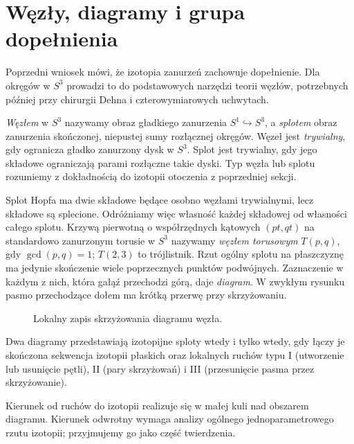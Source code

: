 \section{Węzły, diagramy i grupa dopełnienia}
\label{sec:wezly-diagramy-wirtinger}

Poprzedni wniosek mówi, że izotopia zanurzeń zachowuje
dopełnienie. Dla okręgów w $S^3$ prowadzi to do
podstawowych narzędzi teorii węzłów, potrzebnych później
przy chirurgii Dehna i czterowymiarowych uchwytach.

\begin{definicja}
\emph{Węzłem} w $S^3$ nazywamy obraz gładkiego
zanurzenia $S^1\hookrightarrow S^3$, a \emph{splotem}
obraz zanurzenia skończonej, niepustej sumy rozłącznej
okręgów. Węzeł jest \emph{trywialny}, gdy ogranicza
gładko zanurzony dysk w $S^3$. Splot jest trywialny,
gdy jego składowe ograniczają parami rozłączne takie
dyski. Typ węzła lub splotu rozumiemy z dokładnością
do izotopii otoczenia z poprzedniej sekcji.
\end{definicja}

Splot Hopfa ma dwie składowe będące osobno węzłami
trywialnymi, lecz składowe są splecione. Odróżniamy
więc własność każdej składowej od własności całego
splotu. Krzywą pierwotną o współrzędnych kątowych
$(pt,qt)$ na standardowo zanurzonym torusie w $S^3$
nazywamy \emph{węzłem torusowym} $T(p,q)$, gdy
$\gcd(p,q)=1$; $T(2,3)$ to trójlistnik.
Rzut ogólny splotu na płaszczyznę ma jedynie
skończenie wiele poprzecznych punktów podwójnych.
Zaznaczenie w każdym z nich, która gałąź przechodzi
górą, daje \emph{diagram}. W zwykłym rysunku pasmo
przechodzące dołem ma krótką przerwę przy skrzyżowaniu.

\begin{figure}[htbp]
\centering
{}
\caption{Lokalny zapis skrzyżowania diagramu węzła.}
\label{fig:wezel-skrzyzowanie-20}
\end{figure}

\begin{twierdzenie}
Dwa diagramy przedstawiają izotopijne sploty wtedy
i tylko wtedy, gdy łączy je skończona sekwencja
izotopii płaskich oraz lokalnych ruchów typu I
(utworzenie lub usunięcie pętli), II (pary skrzyżowań)
i III (przesunięcie pasma przez skrzyżowanie).
\end{twierdzenie}
\noindent Kierunek od ruchów do izotopii realizuje się
w małej kuli nad obszarem diagramu. Kierunek odwrotny
wymaga analizy ogólnego jednoparametrowego rzutu
izotopii; przyjmujemy go jako część twierdzenia.

